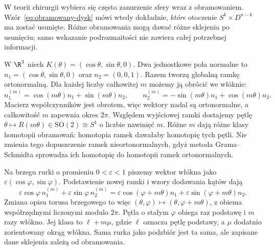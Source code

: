 W teorii chirurgii wybiera się
często zanurzenie sfery wraz z
obramowaniem. Wzór~\eqref{eq:obramowany-dysk}
mówi wtedy dokładnie, \emph{które}
otoczenie $S^k\times D^{n-k}$
ma zostać usunięte. Różne obramowania
mogą dawać różne sklejenia po usunięciu;
samo wskazanie podrozmaitości
nie zawiera całej potrzebnej informacji.

\begin{przyklad}
\label{prz:obramowania-okregu-20}
W $\R^3$ niech $K(\theta)=(\cos\theta,\sin\theta,0)$.
Dwa jednostkowe pola normalne to
$n_1=(\cos\theta,\sin\theta,0)$ oraz $n_2=(0,0,1)$.
Razem tworzą globalną ramkę ortonormalną.
Dla każdej liczby całkowitej $m$ możemy ją obrócić we włóknie:
\[
 n_1^{(m)}=\cos(m\theta)n_1+\sin(m\theta)n_2,\qquad
 n_2^{(m)}=-\sin(m\theta)n_1+\cos(m\theta)n_2.
\]
Macierz współczynników jest obrotem, więc wektory nadal
są ortonormalne, a całkowitość $m$ zapewnia okres $2\pi$.
Względem wyjściowej ramki dostajemy pętlę
$\theta\mapsto R(m\theta)\in\mathrm{SO}(2)\cong S^1$
o liczbie nawinięć $m$.
Różne $m$ dają różne klasy homotopii obramowań:
homotopia ramek dawałaby homotopię tych pętli.
Nie zmienia tego dopuszczenie ramek nieortonormalnych,
gdyż metoda Grama--Schmidta sprowadza ich homotopię
do homotopii ramek ortonormalnych.

Na brzegu rurki o promieniu $0<\varepsilon<1$
piszemy wektor włókna jako
$\varepsilon(\cos\varphi,\sin\varphi)$.
Podstawienie nowej ramki i wzory dodawania kątów dają
\[
 \varepsilon\cos\varphi\,n_1^{(m)}
 +\varepsilon\sin\varphi\,n_2^{(m)}
 =\varepsilon\cos(\varphi+m\theta)n_1
  +\varepsilon\sin(\varphi+m\theta)n_2.
\]
Zmiana opisu torusa brzegowego to więc
$(\theta,\varphi)\mapsto(\theta,\varphi+m\theta)$,
z obiema współrzędnymi liczonymi modulo $2\pi$.
Pętla o stałym $\varphi$ obiega raz podstawę i $m$ razy
włókno. Jej klasa to $\ell+m\mu$, gdzie $\ell$ oznacza
pętlę podstawy, a $\mu$ dodatnio zorientowany okrąg włókna.
Sama rurka jako podzbiór jest ta sama,
ale zapisane dane sklejenia zależą od obramowania.

\begin{center}
\end{center}
\end{przyklad}

